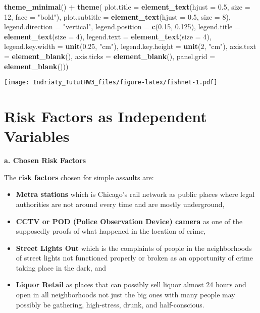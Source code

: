 \documentclass[
]{article}
\newenvironment{Shaded}{\begin{snugshade}}{\end{snugshade}}
\newcommand{\AttributeTok}[1]{\textcolor[rgb]{0.13,0.29,0.53}{#1}}
\newcommand{\DecValTok}[1]{\textcolor[rgb]{0.00,0.00,0.81}{#1}}
\newcommand{\FloatTok}[1]{\textcolor[rgb]{0.00,0.00,0.81}{#1}}
\newcommand{\FunctionTok}[1]{\textcolor[rgb]{0.13,0.29,0.53}{\textbf{#1}}}
\newcommand{\NormalTok}[1]{#1}
\newcommand{\SpecialCharTok}[1]{\textcolor[rgb]{0.81,0.36,0.00}{\textbf{#1}}}
\newcommand{\StringTok}[1]{\textcolor[rgb]{0.31,0.60,0.02}{#1}}
\begin{document}
\begin{Shaded}
\begin{Highlighting}[]
  \FunctionTok{theme\_minimal}\NormalTok{() }\SpecialCharTok{+}
  \FunctionTok{theme}\NormalTok{(}
    \AttributeTok{plot.title =} \FunctionTok{element\_text}\NormalTok{(}\AttributeTok{hjust =} \FloatTok{0.5}\NormalTok{, }\AttributeTok{size =} \DecValTok{12}\NormalTok{, }\AttributeTok{face =} \StringTok{"bold"}\NormalTok{),}
    \AttributeTok{plot.subtitle =} \FunctionTok{element\_text}\NormalTok{(}\AttributeTok{hjust =} \FloatTok{0.5}\NormalTok{, }\AttributeTok{size =} \DecValTok{8}\NormalTok{),}
    \AttributeTok{legend.direction =} \StringTok{"vertical"}\NormalTok{,}
    \AttributeTok{legend.position =} \FunctionTok{c}\NormalTok{(}\FloatTok{0.15}\NormalTok{, }\FloatTok{0.125}\NormalTok{),}
    \AttributeTok{legend.title =} \FunctionTok{element\_text}\NormalTok{(}\AttributeTok{size =} \DecValTok{4}\NormalTok{),}
    \AttributeTok{legend.text =} \FunctionTok{element\_text}\NormalTok{(}\AttributeTok{size =} \DecValTok{4}\NormalTok{),}
    \AttributeTok{legend.key.width =} \FunctionTok{unit}\NormalTok{(}\FloatTok{0.25}\NormalTok{, }\StringTok{"cm"}\NormalTok{),}
    \AttributeTok{legend.key.height =} \FunctionTok{unit}\NormalTok{(}\DecValTok{2}\NormalTok{, }\StringTok{"cm"}\NormalTok{),}
    \AttributeTok{axis.text =} \FunctionTok{element\_blank}\NormalTok{(),}
    \AttributeTok{axis.ticks =} \FunctionTok{element\_blank}\NormalTok{(),}
    \AttributeTok{panel.grid =} \FunctionTok{element\_blank}\NormalTok{()))}
\end{Highlighting}
\end{Shaded}

\texttt{[image: Indriaty\_TututHW3\_files/figure-latex/fishnet-1.pdf]}

\section{Risk Factors as Independent
Variables}\label{risk-factors-as-independent-variables}

\textbf{a. Chosen Risk Factors}

The \textbf{risk factors} chosen for simple assaults are:

\begin{itemize}
\item
  \textbf{Metra stations} which is Chicago's rail network as public
  places where legal authorities are not around every time and are
  mostly underground,
\item
  \textbf{CCTV or POD (Police Observation Device) camera} as one of the
  supposedly proofs of what happened in the location of crime,
\item
  \textbf{Street Lights Out} which is the complaints of people in the
  neighborhoods of street lights not functioned properly or broken as an
  opportunity of crime taking place in the dark, and
\item
  \textbf{Liquor Retail} as places that can possibly sell liquor almost
  24 hours and open in all neighborhoods not just the big ones with many
  people may possibly be gathering, high-stress, drunk, and
  half-conscious.
\end{itemize}
\end{document}
